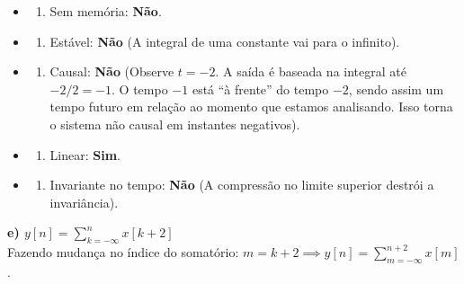 \begin{itemize}
\tightlist
\item
  \begin{enumerate}
  \def\labelenumi{(\roman{enumi})}
  \tightlist
  \item
    Sem memória: \textbf{Não}.
  \end{enumerate}
\item
  \begin{enumerate}
  \def\labelenumi{(\roman{enumi})}
  \setcounter{enumi}{1}
  \tightlist
  \item
    Estável: \textbf{Não} (A integral de uma constante vai para o infinito).
  \end{enumerate}
\item
  \begin{enumerate}
  \def\labelenumi{(\roman{enumi})}
  \setcounter{enumi}{2}
  \tightlist
  \item
    Causal: \textbf{Não} (Observe \(t = -2\). A saída é baseada na integral até \(-2/2 = -1\). O tempo \(-1\) está ``à frente'' do tempo \(-2\), sendo assim um tempo futuro em relação ao momento que estamos analisando. Isso torna o sistema não causal em instantes negativos).
  \end{enumerate}
\item
  \begin{enumerate}
  \def\labelenumi{(\roman{enumi})}
  \setcounter{enumi}{3}
  \tightlist
  \item
    Linear: \textbf{Sim}.
  \end{enumerate}
\item
  \begin{enumerate}
  \def\labelenumi{(\alph{enumi})}
  \setcounter{enumi}{21}
  \tightlist
  \item
    Invariante no tempo: \textbf{Não} (A compressão no limite superior destrói a invariância).
  \end{enumerate}
\end{itemize}

\textbf{e) \(y[n] = \sum_{k=-\infty}^{n} x[k + 2]\)}\\
Fazendo mudança no índice do somatório: \(m = k+2 \implies y[n] = \sum_{m=-\infty}^{n+2} x[m]\).

